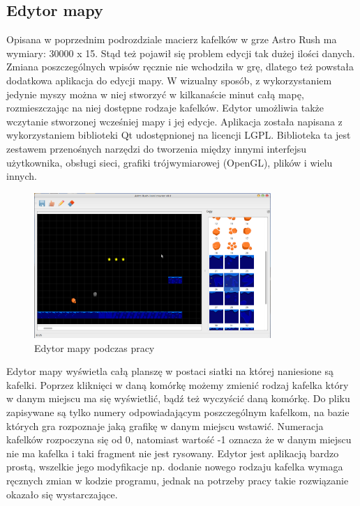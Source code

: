 \subsection{Edytor mapy}
Opisana w poprzednim podrozdziale macierz kafelków w grze Astro Rush ma wymiary: 30000 x 15. Stąd też pojawił się problem edycji tak dużej ilości danych. Zmiana poszczególnych wpisów ręcznie nie wchodziła w grę, dlatego też powstała dodatkowa aplikacja do edycji mapy. W wizualny sposób, z wykorzystaniem jedynie myszy można w niej stworzyć w kilkanaście minut całą mapę, rozmieszczając na niej dostępne rodzaje kafelków. Edytor umożliwia także wczytanie stworzonej wcześniej mapy i jej edycje. Aplikacja została napisana z wykorzystaniem biblioteki Qt udostępnionej na licencji LGPL. Biblioteka ta jest zestawem przenośnych narzędzi do tworzenia między innymi interfejsu użytkownika, obsługi sieci, grafiki trójwymiarowej (OpenGL), plików i wielu innych. 


\begin{figure}[h]
    \centering
    \includegraphics[width=0.8\textwidth,natwidth=800,natheight=160]{./Pictures/designer.png}
    \caption{Edytor mapy podczas pracy}
\end{figure}

Edytor mapy wyświetla całą planszę w postaci siatki na której naniesione są kafelki. Poprzez kliknięci w daną komórkę możemy zmienić rodzaj kafelka który w danym miejscu ma się wyświetlić, bądź też wyczyścić daną komórkę. Do pliku zapisywane są tylko numery odpowiadającym poszczególnym kafelkom, na bazie których gra rozpoznaje jaką grafikę w danym miejscu wstawić. Numeracja kafelków rozpoczyna się od 0, natomiast wartość -1 oznacza że w danym miejscu nie ma kafelka i taki fragment nie jest rysowany. Edytor jest aplikacją bardzo prostą, wszelkie jego modyfikacje np. dodanie nowego rodzaju kafelka wymaga ręcznych zmian w kodzie programu, jednak na potrzeby pracy takie rozwiązanie okazało się wystarczające.

